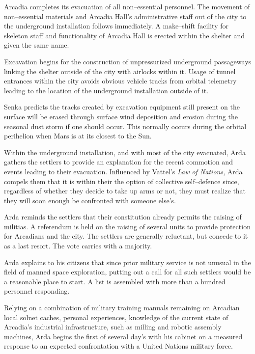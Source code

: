 Arcadia completes its evacuation of all non--essential personnel. The movement of non--essential materials and Arcadia Hall's administrative staff out of the city to the underground installation follows immediately. A make--shift facility for skeleton staff and functionality of Arcadia Hall is erected within the shelter and given the same name.

Excavation begins for the construction of unpressurized underground passageways linking the shelter outside of the city with airlocks within it. Usage of tunnel entrances within the city avoids obvious vehicle tracks from orbital telemetry leading to the location of the underground installation outside of it. 

Senka predicts the tracks created by excavation equipment still present on the surface will be erased through surface wind deposition and erosion during the seasonal dust storm if one should occur. This normally occurs during the orbital perihelion when Mars is at its closest to the Sun.

Within the underground installation, and with most of the city evacuated, Arda gathers the settlers to provide an explanation for the recent commotion and events leading to their evacuation. Influenced by Vattel's {\it Law of Nations}, Arda compels them that it is within their  the option of collective self--defence since, regardless of whether they decide to take up arms or not, they must realize that they will soon enough be confronted with someone else's.

Arda reminds the settlers that their constitution already permits the raising of militias. A referendum is held on the raising of several units to provide protection for Arcadians and the city. The settlers are generally reluctant, but concede to it as a last resort. The vote carries with a majority.

Arda explains to his citizens that since prior military service is not unusual in the field of manned space exploration, putting out a call for all such settlers would be a reasonable place to start. A list is assembled with more than a hundred personnel responding.
\StopTimelineDate

Relying on a combination of military training manuals remaining on Arcadian local solnet caches, personal experiences, knowledge of the current state of Arcadia's industrial infrastructure, such as milling and robotic assembly machines, Arda begins the first of several day's with his cabinet on a measured response to an expected confrontation with a United Nations military force.


